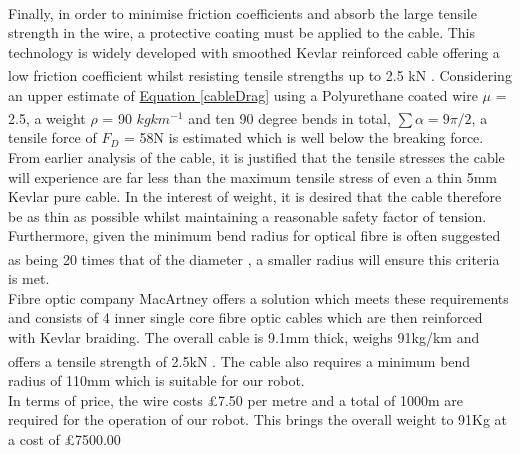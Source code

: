 \documentclass[11pt]{article}		%
\newcommand{\supercite}[1]{\textsuperscript{\cite{#1}}}		%
\newcommand{\equationref}[1]{\hyperref[#1]{Equation \ref*{#1}}}     %
\begin{document}
		    \\
            \hspace*{3ex}Finally, in order to minimise friction coefficients and absorb the large tensile strength in the wire, a protective coating must be applied to the cable. 
		    This technology is widely developed with smoothed Kevlar reinforced cable offering a low friction coefficient whilst resisting tensile strengths up to 2.5 kN \supercite{macartney}. 
		    Considering an upper estimate of \equationref{cableDrag} using a Polyurethane coated wire $\mu$ = 2.5, a weight $\rho$ = 90 $kgkm^{-1}$ \supercite{macartney} and ten 90 degree bends in total, $\sum \alpha = 9\pi/2$, a tensile force of $F_D$ = 58N is estimated which is well below the breaking force.
		    \\
            \hspace*{3ex}From earlier analysis of the cable, it is justified that the tensile stresses the cable will experience are far less than the maximum tensile stress of even a thin 5mm Kevlar pure cable. In the interest of weight, it is desired that the cable therefore be as thin as possible whilst maintaining a reasonable safety factor of tension. Furthermore, given the minimum bend radius for optical fibre is often suggested as being 20 times that of the diameter \supercite{fibrebend}, a smaller radius will ensure this criteria is met.\\
  	    	\hspace*{3ex}Fibre optic company MacArtney offers a solution which meets these requirements and consists of 4 inner single core fibre optic cables which are then reinforced with Kevlar braiding. The overall cable is 9.1mm thick, weighs 91kg/km and offers a tensile strength of 2.5kN \supercite{macartney}. The cable also requires a minimum bend radius of 110mm which is suitable for our robot. \\
  	    	\hspace*{3ex}In terms of price, the wire costs £7.50 per metre and a total of 1000m are required for the operation of our robot. This brings the overall weight to 91Kg at a cost of £7500.00 
		    	    	
\end{document}
